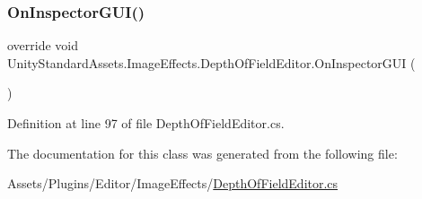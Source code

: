 \subsubsection{\texorpdfstring{On\+Inspector\+G\+U\+I()}{OnInspectorGUI()}}
{\footnotesize\ttfamily override void Unity\+Standard\+Assets.\+Image\+Effects.\+Depth\+Of\+Field\+Editor.\+On\+Inspector\+G\+UI (\begin{DoxyParamCaption}{ }\end{DoxyParamCaption})}



Definition at line 97 of file Depth\+Of\+Field\+Editor.\+cs.



The documentation for this class was generated from the following file\+:\begin{DoxyCompactItemize}
\item 
Assets/\+Plugins/\+Editor/\+Image\+Effects/\mbox{\hyperlink{_depth_of_field_editor_8cs}{Depth\+Of\+Field\+Editor.\+cs}}\end{DoxyCompactItemize}
